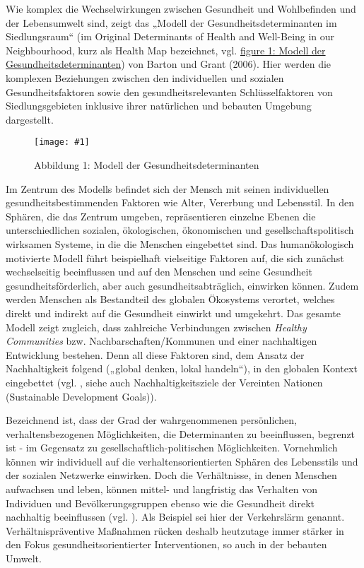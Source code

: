 \documentclass{article}
\newlength{\imgwidth}
\newcommand\scaledgraphics[2]{%
                
\settowidth{\imgwidth}{\texttt{[image: \#1]}}%
                
\setlength{\imgwidth}{\minof{\imgwidth}{#2\textwidth}}%
                
\texttt{[image: \#1]}%
                
}
\begin{document}
Wie komplex die Wechselwirkungen zwischen Gesundheit und Wohlbefinden und der Lebensumwelt sind, zeigt das „Modell der Gesundheitsdeterminanten im Siedlungsraum“ (im Original Determinants of Health and Well-Being in our Neighbourhood, kurz als Health Map bezeichnet, vgl. \hyperlink{F72875031}{figure 1: Modell der Gesundheitsdeterminanten}) von Barton und Grant (2006). Hier werden die komplexen Beziehungen zwischen den individuellen und sozialen Gesundheitsfaktoren sowie den gesundheitsrelevanten Schlüsselfaktoren von Siedlungsgebieten inklusive ihrer natürlichen und bebauten Umgebung dargestellt.

\begin{figure}
\scaledgraphics{24b771d8-2005-44ea-8d56-c49c62ed732a.jpg}{1}
\caption*{Abbildung 1: Modell der Gesundheitsdeterminanten}\label{F96167441}
\end{figure}


Im Zentrum des Modells befindet sich der Mensch mit seinen individuellen gesundheitsbestimmenden Faktoren wie Alter, Vererbung und Lebensstil. In den Sphären, die das Zentrum umgeben, repräsentieren einzelne Ebenen die unterschiedlichen sozialen, ökologischen, ökonomischen und gesellschaftspolitisch wirksamen Systeme, in die die Menschen eingebettet sind. Das humanökologisch motivierte Modell führt beispielhaft vielseitige Faktoren auf, die sich zunächst wechselseitig beeinflussen und auf den Menschen und seine Gesundheit gesundheitsförderlich, aber auch gesundheitsabträglich, einwirken können. Zudem werden Menschen als Bestandteil des globalen Ökosystems verortet, welches direkt und indirekt auf die Gesundheit einwirkt und umgekehrt. Das gesamte Modell zeigt zugleich, dass zahlreiche Verbindungen zwischen \emph{Healthy Communities} bzw. Nachbarschaften/Kommunen und einer nachhaltigen Entwicklung bestehen. Denn all diese Faktoren sind, dem Ansatz der Nachhaltigkeit folgend („global denken, lokal handeln“), in den globalen Kontext eingebettet (vgl. \autocite{BartonHughundweitere2006}, siehe auch Nachhaltigkeitsziele der Vereinten Nationen (Sustainable Development Goals)).


Bezeichnend ist, dass der Grad der wahrgenommenen persönlichen, verhaltensbezogenen Möglichkeiten, die Determinanten zu beeinflussen, begrenzt ist - im Gegensatz zu gesellschaftlich-politischen Möglichkeiten. Vornehmlich können wir individuell auf die verhaltensorientierten Sphären des Lebensstils und der sozialen Netzwerke einwirken. Doch die Verhältnisse, in denen Menschen aufwachsen und leben, können mittel- und langfristig das Verhalten von Individuen und Bevölkerungsgruppen ebenso wie die Gesundheit direkt nachhaltig beeinflussen (vgl. \autocite{ClaßenThomas2020}). Als Beispiel sei hier der Verkehrslärm genannt. Verhältnispräventive Maßnahmen rücken deshalb heutzutage immer stärker in den Fokus gesundheitsorientierter Interventionen, so auch in der bebauten Umwelt.
\end{document}
